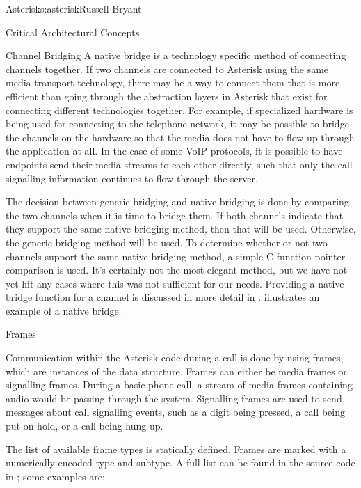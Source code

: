 \begin{aosachapter}{Asterisk}{s:asterisk}{Russell Bryant}
\begin{aosasect1}{Critical Architectural Concepts}
\begin{aosasect2}{Channel Bridging}
A native bridge is a technology specific method of connecting channels
together. If two channels are connected to Asterisk using the same
media transport technology, there may be a way to connect them that is
more efficient than going through the abstraction layers in Asterisk
that exist for connecting different technologies together. For
example, if specialized hardware is being used for connecting to the
telephone network, it may be possible to bridge the channels on the
hardware so that the media does not have to flow up through the
application at all. In the case of some VoIP protocols, it is possible
to have endpoints send their media streams to each other directly,
such that only the call signalling information continues to flow
through the server.

The decision between generic bridging and native bridging is done by
comparing the two channels when it is time to bridge them. If both
channels indicate that they support the same native bridging method,
then that will be used. Otherwise, the generic bridging method will be
used. To determine whether or not two channels support the same native
bridging method, a simple C function pointer comparison is used. It's
certainly not the most elegant method, but we have not yet hit any
cases where this was not sufficient for our needs. Providing a native
bridge function for a channel is discussed in more detail in
.
 illustrates an example of a
native bridge.


\end{aosasect2}

\begin{aosasect2}{Frames}

Communication within the Asterisk code during a call is done by using
frames, which are instances of the  data
structure. Frames can either be media frames or signalling frames.
During a basic phone call, a stream of media frames containing audio
would be passing through the system. Signalling frames are used to send
messages about call signalling events, such as a digit being pressed, a
call being put on hold, or a call being hung up.

The list of available frame types is statically defined. Frames are
marked with a numerically encoded type and subtype.  A full list can
be found in the source code in ; some
examples are:


\end{aosasect2}
\end{aosasect1}
\end{aosachapter}
